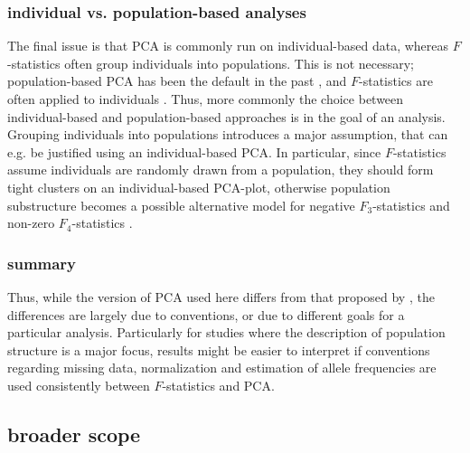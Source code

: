 \documentclass[12pt,fullpage, a4paper]{article}
\begin{document}
\subsubsection{individual vs. population-based analyses}
The final issue is that PCA is commonly run on individual-based data, whereas $F$-statistics often group individuals into populations. This is not necessary; population-based PCA has been the default in the past \citep{cavalli-sforza1994}, and $F$-statistics are often applied to individuals \citep[e.g.][]{green2010, massilani2020, yang2020}. Thus, more commonly the choice between individual-based and population-based approaches is in the goal of an analysis. Grouping individuals into populations introduces a major assumption, that can e.g. be justified using an individual-based PCA. In particular, since $F$-statistics assume individuals are randomly drawn from a population, they should form tight clusters on an individual-based PCA-plot, otherwise population substructure becomes a possible alternative model for negative $F_3$-statistics and non-zero $F_4$-statistics \citep{peter2016}.

\subsubsection{summary}
Thus, while the version of PCA used here differs from that proposed by \cite{patterson2012}, the differences are largely due to conventions, or due to different goals for a particular analysis. Particularly for studies where the description of population structure is a major focus, results might be easier to interpret if  conventions regarding missing data, normalization and estimation of allele frequencies are used consistently between $F$-statistics and PCA.








\subsection{broader scope}
\end{document}
